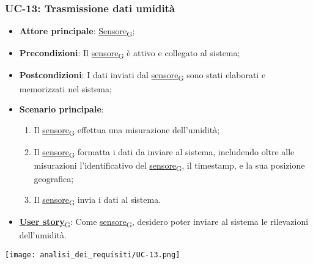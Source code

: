 \subsubsection{UC-13: Trasmissione dati umidità}
\begin{itemize}
	\item \textbf{Attore principale}: \href{https://7last.github.io/docs/rtb/documentazione-interna/glossario\#sensore}{Sensore\textsubscript{G}};
	\item \textbf{Precondizioni}: Il \href{https://7last.github.io/docs/rtb/documentazione-interna/glossario\#sensore}{sensore\textsubscript{G}} è attivo e collegato al sistema;
	\item \textbf{Postcondizioni}: I dati inviati dal \href{https://7last.github.io/docs/rtb/documentazione-interna/glossario\#sensore}{sensore\textsubscript{G}} sono stati elaborati e memorizzati nel sistema;
	\item \textbf{Scenario principale}:
	      \begin{enumerate}
		      \item Il \href{https://7last.github.io/docs/rtb/documentazione-interna/glossario\#sensore}{sensore\textsubscript{G}} effettua una misurazione dell'umidità;
		      \item Il \href{https://7last.github.io/docs/rtb/documentazione-interna/glossario\#sensore}{sensore\textsubscript{G}} formatta i dati da inviare al sistema, includendo oltre alle misurazioni l'identificativo del \href{https://7last.github.io/docs/rtb/documentazione-interna/glossario\#sensore}{sensore\textsubscript{G}},
		            il timestamp, e la sua posizione geografica;
		      \item Il \href{https://7last.github.io/docs/rtb/documentazione-interna/glossario\#sensore}{sensore\textsubscript{G}} invia i dati al sistema.
	      \end{enumerate}
	\item \href{https://7last.github.io/docs/rtb/documentazione-interna/glossario\#user-story}{\textbf{User story}\textsubscript{G}}: Come \href{https://7last.github.io/docs/rtb/documentazione-interna/glossario\#sensore}{sensore\textsubscript{G}}, desidero poter inviare al sistema le rilevazioni dell'umidità.
\end{itemize}

\begin{center}
	\texttt{[image: analisi\_dei\_requisiti/UC-13.png]}
\end{center}

